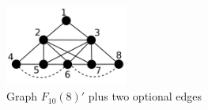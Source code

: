  \begin{figure}[htb]	
 \center%
 \includegraphics[width=4cm]{./img/f10-8opc.png}
 \caption{Graph $F_{10}(8)'$ plus two optional edges}
\label{fig:f10-8opc}
\end{figure}  
 
